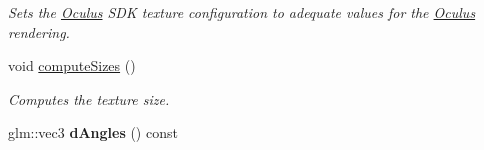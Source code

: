 \begin{DoxyCompactItemize}
\begin{DoxyCompactList}\small\item\em Sets the \hyperlink{classOculus}{Oculus} S\+D\+K texture configuration to adequate values for the \hyperlink{classOculus}{Oculus} rendering. \end{DoxyCompactList}\item 
void \hyperlink{classOculus_a21273c2c3dd1e2d4b9d113cac0d72ec3}{compute\+Sizes} ()
\begin{DoxyCompactList}\small\item\em Computes the texture size. \end{DoxyCompactList}\item 
\hypertarget{classOculus_a4a26271c5d8d4f7350bb7b85c829dd97}{}glm\+::vec3 {\bfseries d\+Angles} () const \label{classOculus_a4a26271c5d8d4f7350bb7b85c829dd97}

\end{DoxyCompactItemize}
